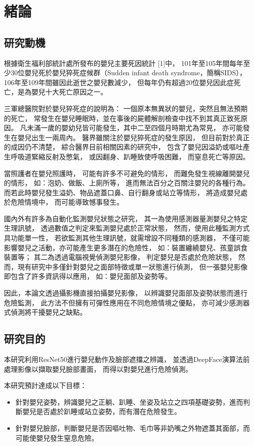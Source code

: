 \documentclass[class=NCU_thesis, crop=false]{standalone}
\begin{document}
\chapter{緒論}
\section{研究動機}
根據衛生福利部統計處所發布的嬰兒主要死因統計 [1]中，
101年至105年間每年至少30位嬰兒死於嬰兒猝死症候群（Sudden infant death syndrome，簡稱SIDS），
106年至109年間雖因此逝世之嬰兒數減少，
但每年仍有超過20位嬰兒因此症死亡，是為嬰兒十大死亡原因之一。

三軍總醫院對於嬰兒猝死症的說明為：
一個原本無異狀的嬰兒，突然且無法預期的死亡，
常發生在嬰兒睡眠時，並在事後的屍體解剖檢查中找不到其真正致死原因。
凡未滿一歲的嬰幼兒皆可能發生，其中二至四個月時期尤為常見，
亦可能發生在嬰兒出生一兩周內。
醫界雖關注於嬰兒猝死症的發生原因，
但目前對於真正的成因仍不清楚，
綜合醫界目前相關因素的研究中，
包含了嬰兒因溢奶或嘔吐產生呼吸道緊縮反射及憋氣，
或因翻身、趴睡致使呼吸困難，
而窒息死亡等原因。

當照護者在嬰兒照護時，
可能有許多不可避免的情形，
而難免發生視線離開嬰兒的情形，
如：泡奶、做飯、上廁所等，
進而無法百分之百關注嬰兒的各種行為。
而若此時嬰兒發生溢奶、物品遮蓋口鼻、自行翻身或站立等情形，
將造成嬰兒處於危險情境中，
而可能導致憾事發生。

國內外有許多為自動化監測嬰兒狀態之研究，
其一為使用感測器量測嬰兒之特定生理訊號，
透過數值之判定來監測嬰兒處於正常狀態，
然而，使用此種監測方式具功能單一性，
若欲監測其他生理訊號，就需增設不同種類的感測器，
不僅可能影響嬰兒之活動，亦可能產生更多潛在的危險性，
如：裝置纏繞嬰兒、孩童誤食裝置等；
其二為透過電腦視覺偵測嬰兒影像，
判定嬰兒是否處於危險狀態，
然而，現有研究中多僅針對嬰兒之面部特徵或單一狀態進行偵測，
但一張嬰兒影像即包含了許多資訊得以應用，
如：嬰兒面部及姿勢等。

因此，本論文透過攝影機直接拍攝嬰兒影像，
以辨識嬰兒面部及姿勢狀態而進行危險監測，
此方法不但擁有可彈性應用在不同危險情境之優點，
亦可減少感測器式偵測將干擾嬰兒之缺點。

\section{研究目的}
本研究利用ResNet50進行嬰兒動作及臉部遮擋之辨識，
並透過DeepFace演算法前處理影像以擷取嬰兒臉部畫面，
而得以對嬰兒進行危險偵測。

本研究預計達成以下目標：
\begin{itemize}
    \item 針對嬰兒姿勢，辨識嬰兒之正躺、趴睡、坐姿及站立之四項基礎姿勢，進而判斷嬰兒是否處於趴睡或站立姿勢，而有潛在危險發生。
    \item 針對嬰兒臉部，判斷嬰兒是否因嘔吐物、毛巾等非奶嘴之外物遮蓋其面部，而可能使嬰兒發生窒息危險。
\end{itemize}
\end{document}
